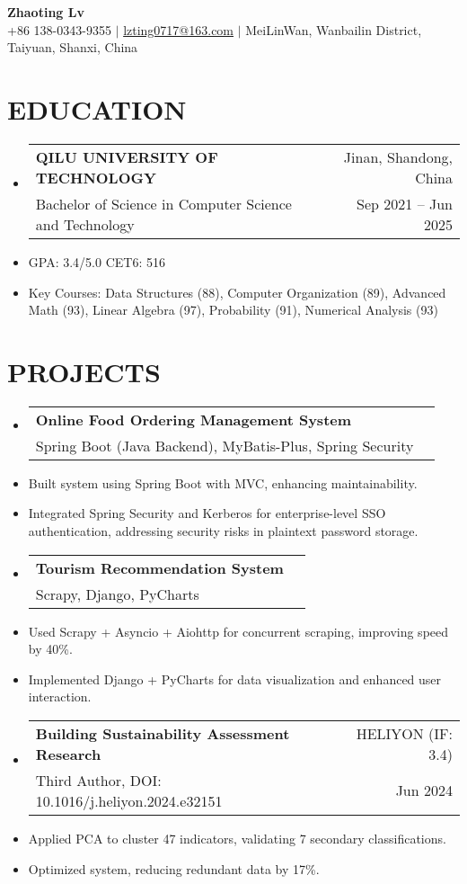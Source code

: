 \documentclass[a4paper,11pt]{article}
\makeatletter
\newenvironment{resumeList}{\begin{itemize}[leftmargin=*,label={}]}{\end{itemize}}
\newcommand{\resumeItem}[1]{\item\small{#1}}
\newcommand{\resumeEntry}[4]{
  \item \begin{tabular*}{0.97\textwidth}{l@{\extracolsep{\fill}}r}
    \textbf{#1} & #2 \\
    #3 & #4 \\
  \end{tabular*}
}
\makeatother
\begin{document}
\begin{center}
    {\Huge\bfseries Zhaoting Lv} \\ \vspace{3pt}
    \small
    \faMobile \hspace{.5pt} +86 138-0343-9355 $|$ 
    \faAt \hspace{.5pt} \href{mailto:lvzting0717@163.com}{lzting0717@163.com} $|$ 
    \faMapMarker \hspace{.5pt} MeiLinWan, Wanbailin District, Taiyuan, Shanxi, China 
\end{center}

\section{EDUCATION}
\begin{resumeList}
    \resumeEntry{QILU UNIVERSITY OF TECHNOLOGY}
    {Jinan, Shandong, China}
    {Bachelor of Science in Computer Science and Technology}
    {Sep 2021 -- Jun 2025}
    
    \resumeItem{GPA: 3.4/5.0 \qquad CET6: 516} 
    \resumeItem{Key Courses: Data Structures (88), Computer Organization (89), Advanced Math (93), Linear Algebra (97), Probability (91), Numerical Analysis (93)}
\end{resumeList}

\section{PROJECTS}
\begin{resumeList}
    \resumeEntry{Online Food Ordering Management System}
    {}
    {Spring Boot (Java Backend), MyBatis-Plus, Spring Security}
    {}

    \resumeItem{Built system using Spring Boot with MVC, enhancing maintainability.}
    \resumeItem{Integrated Spring Security and Kerberos for enterprise-level SSO authentication, addressing security risks in plaintext password storage.}

    \resumeEntry{Tourism Recommendation System}
    {}
    {Scrapy, Django, PyCharts}
    {}

    \resumeItem{Used Scrapy + Asyncio + Aiohttp for concurrent scraping, improving speed by 40\%.}
    \resumeItem{Implemented Django + PyCharts for data visualization and enhanced user interaction.}

    \resumeEntry{Building Sustainability Assessment Research}
    {HELIYON (IF: 3.4)}
    {Third Author, DOI: 10.1016/j.heliyon.2024.e32151}
    {Jun 2024}

    \resumeItem{Applied PCA to cluster 47 indicators, validating 7 secondary classifications.}
    \resumeItem{Optimized system, reducing redundant data by 17\%.}
\end{resumeList}
\end{document}
